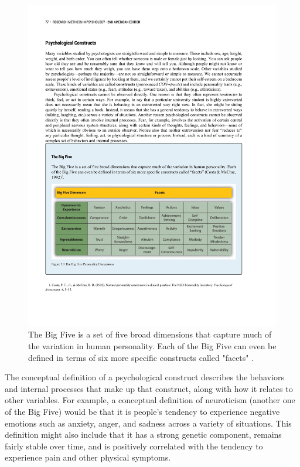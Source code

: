 \begin{figure}
      \includegraphics[width=\linewidth]{figures/C5bigfive.pdf}
      \caption{The Big Five is a set of five broad dimensions that capture much of the variation in human personality. Each of the Big Five can even be defined in terms of six more specific constructs called "facets" \citep{costa_normal_1992}.
}
      \label{fig:bigfive}
\end{figure}


The conceptual definition of a psychological construct describes the behaviors and internal processes that make up that construct, along with how it relates to other variables. For example, a conceptual definition of neuroticism (another one of the Big Five) would be that it is people's tendency to experience negative emotions such as anxiety, anger, and sadness across a variety of situations. This definition might also include that it has a strong genetic component, remains fairly stable over time, and is positively correlated with the tendency to experience pain and other physical symptoms.

